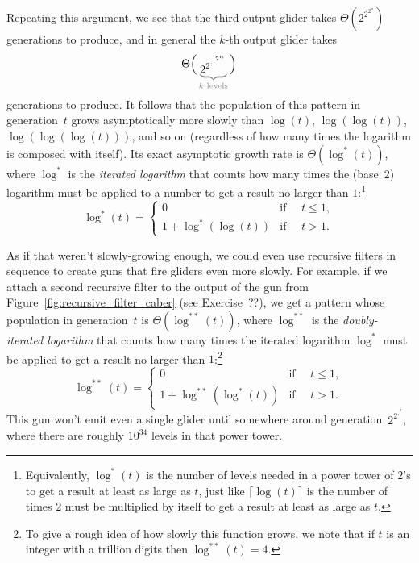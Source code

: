 Repeating this argument, we see that the third output glider takes $\Theta(2^{2^{2^n}})$ generations to produce, and in general the $k$-th output glider takes
\[
\raisebox{0.18cm}{$\displaystyle\Theta\Big($}\begingroup\color{gray}\underbrace{{\color{black}2^{2^{\cdot^{\cdot^{2^n}}}}}}_{\text{\color{gray}$k$ levels}}\endgroup\raisebox{0.18cm}{$\displaystyle\Big)$}
\]
generations to produce. It follows that the population of this pattern in generation~$t$ grows asymptotically more slowly than $\log(t)$, $\log(\log(t))$, $\log(\log(\log(t)))$, and so on (regardless of how many times the logarithm is composed with itself). Its exact asymptotic growth rate is $\Theta(\log^*(t))$, where $\log^*$ is the \emph{iterated logarithm} that counts how many times the (base~$2$) logarithm must be applied to a number to get a result no larger than $1$:\footnote{Equivalently, $\log^*(t)$ is the number of levels needed in a power tower of $2$'s to get a result at least as large as $t$, just like $\lceil\log(t)\rceil$ is the number of times $2$ must be multiplied by itself to get a result at least as large as $t$.}
\[
\log^*(t) =
\begin{cases}
0                  & \mbox{if } \quad t \leq 1, \\
1 + \log^*(\log(t)) & \mbox{if } \quad t > 1.
\end{cases}
\]

As if that weren't slowly-growing enough, we could even use recursive filters in sequence to create guns that fire gliders even more slowly. For example, if we attach a second recursive filter to the output of the gun from Figure~\ref{fig:recursive_filter_caber} (see Exercise~??), we get a pattern whose population in generation~$t$ is $\Theta(\log^{**}(t))$, where $\log^{**}$ is the \emph{doubly-iterated logarithm} that counts how many times the iterated logarithm $\log^*$ must be applied to get a result no larger than $1$:\footnote{To give a rough idea of how slowly this function grows, we note that if $t$ is an integer with a trillion digits then $\log^{**}(t) = 4$.}
\[
\log^{**}(t) =
\begin{cases}
0                  & \mbox{if } \quad t \leq 1, \\
1 + \log^{**}(\log^{*}(t)) & \mbox{if } \quad t > 1.
\end{cases}
\]
This gun won't emit even a single glider until somewhere around generation~$2^{2^{\cdot^{\cdot^{2}}}}$, where there are roughly $10^{34}$ levels in that power tower.


